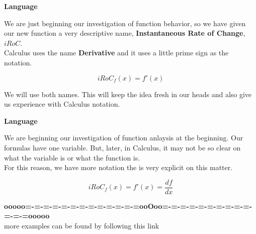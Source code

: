 \documentclass{ximera}
\begin{document}
\begin{notation} \textbf{\textcolor{blue!55!black}{Language}} 


We are just beginning our investigation of function behavior, so we have given our new function a very descriptive name, \textbf{\textcolor{blue!55!black}{Instantaneous Rate of Change}},  \textbf{\textcolor{blue!55!black}{$iRoC$}}. \\


Calculus uses the name \textbf{\textcolor{blue!55!black}{Derivative}} and it uses a little prime sign as the notation.



\[
iRoC_f(x) = f'(x)
\]

\end{notation}

We will use both names.  This will keep the idea fresh in our heads and also give us experience with Calculus notation.






\begin{notation} \textbf{\textcolor{blue!55!black}{Language}} 


We are beginning our investigation of function anlaysis at the beginning.  Our formulas have one variable.  But, later, in Calculus, it may not be so clear on what the variable is or what the function is. \\

For this reason, we have more notation the is very explicit on this matter.



\[
iRoC_f(x) = f'(x) = \frac{df}{dx}
\]

\end{notation}









\begin{center}
\textbf{\textcolor{green!50!black}{ooooo=-=-=-=-=-=-=-=-=-=-=-=-=ooOoo=-=-=-=-=-=-=-=-=-=-=-=-=ooooo}} \\

more examples can be found by following this link\\ 

\end{center}
\end{document}
